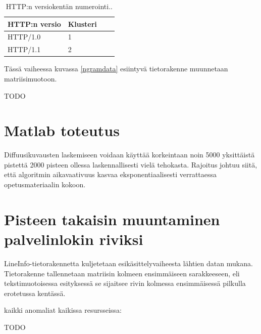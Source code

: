 \begin{table}[h]
\centering
\begin{tabular}{llll}
HTTP:n versio & Klusteri \\
\hline
HTTP/1.0 & 1 \\
HTTP/1.1 & 2 \\
\end{tabular}
\caption{ HTTP:n versiokentän numerointi..}
\label{tiedostot}
\end{table}

Tässä vaiheessa kuvassa \ref{ngramdata} esiintyvä tietorakenne
muunnetaan matriisimuotoon.




TODO

\section{Matlab toteutus}
\label{sec:matlab}

Diffuusikuvausten laskemiseen voidaan käyttää korkeintaan noin 5000 yksittäistä pistettä 2000 pisteen ollessa laskennallisesti vielä tehokasta. Rajoitus johtuu siitä, että
algoritmin aikavaativuus kasvaa eksponentiaalisesti verrattaessa opetusmateriaalin kokoon. 

\section{Pisteen takaisin muuntaminen palvelinlokin riviksi}

LineInfo-tietorakennetta kuljetetaan esikäsittelyvaiheesta
lähtien datan mukana. Tietorakenne tallennetaan matriisin kolmeen
ensimmäiseen sarakkeeseen, eli tekstimuotoisessa esityksessä se
sijaitsee rivin kolmessa ensimmäisessä pilkulla erotetussa kentässä.


kaikki anomaliat kaikissa resursseissa:




TODO
